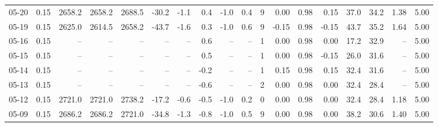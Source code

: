 \begin{threeparttable}
{\begin{tabular}{lrrrrrrrrrrrrrrrrr}
  05-20 &     0.15 & 2658.2 & 2658.2 & 2688.5 &      -30.2 &           -1.1 &                       0.4 &                     -1.0 &                 0.4 &              9 &       0.00 &      0.98 &           0.15 &             37.0 &                34.2 &            1.38 &                   5.00 \\
  05-19 &     0.15 & 2625.0 & 2614.5 & 2658.2 &      -43.7 &           -1.6 &                       0.3 &                     -1.0 &                 0.6 &              9 &      -0.15 &      0.98 &          -0.15 &             43.7 &                35.2 &            1.64 &                   5.00 \\
  05-16 &     0.15 &     -- &     -- &     -- &         -- &             -- &                       0.6 &                       -- &                  -- &              1 &       0.00 &      0.98 &           0.00 &             17.2 &                32.9 &              -- &                   5.00 \\
  05-15 &     0.15 &     -- &     -- &     -- &         -- &             -- &                       0.5 &                       -- &                  -- &              1 &       0.00 &      0.98 &          -0.15 &             26.0 &                31.6 &              -- &                   5.00 \\
  05-14 &     0.15 &     -- &     -- &     -- &         -- &             -- &                      -0.2 &                       -- &                  -- &              1 &       0.15 &      0.98 &           0.15 &             32.4 &                31.6 &              -- &                   5.00 \\
  05-13 &     0.15 &     -- &     -- &     -- &         -- &             -- &                      -0.6 &                       -- &                  -- &              2 &       0.00 &      0.98 &           0.00 &             32.4 &                28.4 &              -- &                   5.00 \\
  05-12 &     0.15 & 2721.0 & 2721.0 & 2738.2 &      -17.2 &           -0.6 &                      -0.5 &                     -1.0 &                 0.2 &              0 &       0.00 &      0.98 &           0.00 &             32.4 &                28.4 &            1.18 &                   5.00 \\
  05-09 &     0.15 & 2686.2 & 2686.2 & 2721.0 &      -34.8 &           -1.3 &                      -0.8 &                     -1.0 &                 0.5 &              9 &       0.00 &      0.98 &           0.00 &             38.2 &                30.6 &            1.40 &                   5.00 \\

\end{tabular}}
\end{threeparttable}
